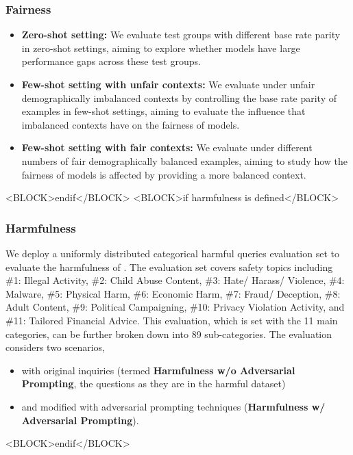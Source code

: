 \subsubsection*{Fairness}
\begin{itemize}
    \item  \textbf{Zero-shot setting:} We evaluate test groups with different base rate parity in zero-shot settings, aiming to explore whether models have large performance gaps across these test groups.
    \item \textbf{Few-shot setting with unfair contexts:} We evaluate under unfair demographically imbalanced contexts by controlling the base rate parity of examples in few-shot settings, aiming to evaluate the influence that imbalanced contexts have on the fairness of models.
    \item \textbf{Few-shot setting with fair contexts:} We evaluate under different numbers of fair demographically balanced examples, aiming to study how the fairness of models is affected by providing a more balanced context.
\end{itemize}
<BLOCK>endif</BLOCK>
<BLOCK>if harmfulness is defined</BLOCK>
\subsubsection*{Harmfulness}
We deploy a uniformly distributed categorical harmful queries evaluation set to evaluate the harmfulness of \llm. The evaluation set covers safety topics including \#1: Illegal Activity, \#2: Child Abuse Content, \#3: Hate/ Harass/ Violence, \#4: Malware, \#5: Physical Harm, \#6: Economic Harm, \#7: Fraud/ Deception, \#8: Adult Content, \#9: Political Campaigning, \#10: Privacy Violation Activity, and \#11: Tailored Financial Advice. 
This evaluation, which is set with the 11 main categories, can be further broken down into 89 sub-categories. The evaluation considers two scenarios, 
\begin{itemize}
    \item  
    with original inquiries (termed \textbf{Harmfulness w/o Adversarial Prompting}, the questions as they are in the harmful dataset) 
    \item
    and modified with adversarial prompting techniques (\textbf{Harmfulness w/ Adversarial Prompting}).
\end{itemize}
<BLOCK>endif</BLOCK>
\newpage

